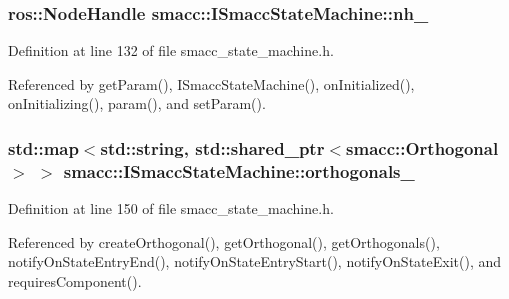 \subsubsection[{\texorpdfstring{nh\+\_\+}{nh_}}]{\setlength{\rightskip}{0pt plus 5cm}ros\+::\+Node\+Handle smacc\+::\+I\+Smacc\+State\+Machine\+::nh\+\_\+\hspace{0.3cm}{\ttfamily [protected]}}\hypertarget{classsmacc_1_1ISmaccStateMachine_ad8877bcca9dbb345fe72cca839c93dd3}{}\label{classsmacc_1_1ISmaccStateMachine_ad8877bcca9dbb345fe72cca839c93dd3}


Definition at line 132 of file smacc\+\_\+state\+\_\+machine.\+h.



Referenced by get\+Param(), I\+Smacc\+State\+Machine(), on\+Initialized(), on\+Initializing(), param(), and set\+Param().

\subsubsection[{\texorpdfstring{orthogonals\+\_\+}{orthogonals_}}]{\setlength{\rightskip}{0pt plus 5cm}std\+::map$<$std\+::string, std\+::shared\+\_\+ptr$<${\bf smacc\+::\+Orthogonal}$>$ $>$ smacc\+::\+I\+Smacc\+State\+Machine\+::orthogonals\+\_\+\hspace{0.3cm}{\ttfamily [protected]}}\hypertarget{classsmacc_1_1ISmaccStateMachine_ae8e5c25d0aecd91fe496df13751bc667}{}\label{classsmacc_1_1ISmaccStateMachine_ae8e5c25d0aecd91fe496df13751bc667}


Definition at line 150 of file smacc\+\_\+state\+\_\+machine.\+h.



Referenced by create\+Orthogonal(), get\+Orthogonal(), get\+Orthogonals(), notify\+On\+State\+Entry\+End(), notify\+On\+State\+Entry\+Start(), notify\+On\+State\+Exit(), and requires\+Component().

